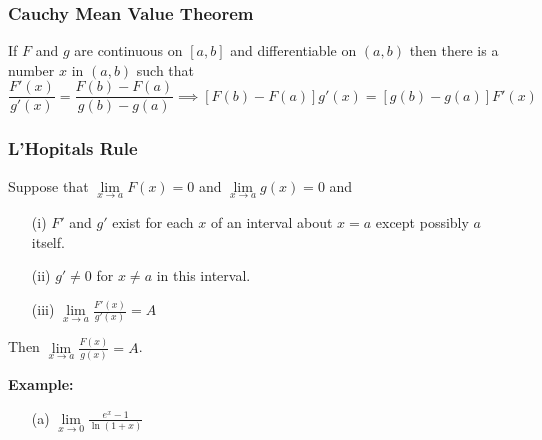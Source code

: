 \documentclass{beamer}
\begin{document}
\begin{frame}
\frametitle{\textbf{Cauchy Mean Value Theorem}}

\begin{theorem}
	If $F$ and $g$ are continuous on $[a,b]$ and differentiable on $(a,b)$ then there is a number $x$ in $(a,b)$ such that
	$$\frac{F'(x)}{g'(x)} = \frac{F(b)-F(a)}{g(b)-g(a)} \implies [F(b)-F(a)]g'(x) = [g(b)-g(a)]F'(x)$$
\end{theorem}
\end{frame}


\begin{frame}
\frametitle{\textbf{L'Hopitals Rule}}
\begin{theorem}
	Suppose that $\lim\limits_{x \to a} F(x)=0$ and $\lim\limits_{x \to a} g(x)=0$ and
	\begin{itemize}
		\item[(i)] $F'$ and $g'$ exist for each $x$ of an interval about $x=a$ except possibly $a$ itself.
		\item[(ii)] $g'\neq0$ for $x\neq a$ in this interval.
		\item[(iii)] $\lim\limits_{x \to a} \frac{F'(x)}{g'(x)}=A$
	\end{itemize}
Then $\lim\limits_{x \to a} \frac{F(x)}{g(x)}=A$.
\end{theorem}
\vspace{6pt}
\textbf{Example:}
\begin{itemize}
	\item[(a)] $\lim\limits_{x\to 0} \frac{e^x-1}{\ln(1+x)}$
\end{itemize}
\end{frame}
\end{document}
